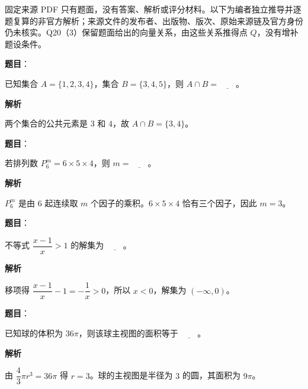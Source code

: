 

\begin{gktip}
固定来源 PDF 只有题面，没有答案、解析或评分材料。以下为编者独立推导并逐题复算的非官方解析；来源文件的发布者、出版物、版次、原始来源链及官方身份仍未核实。Q20（3）保留题面给出的向量关系，由这些关系推得点 $Q$，没有增补题设条件。
\end{gktip}

\begin{answer}

\textbf{题目}：

已知集合 $A=\{1,2,3,4\}$，集合 $B=\{3,4,5\}$，则 $A\cap B=\underline{\qquad}$。

\textbf{解析}

两个集合的公共元素是 $3$ 和 $4$，故 $A\cap B=\{3,4\}$。


\end{answer}
\begin{answer}

\textbf{题目}：

若排列数 $P_6^m=6\times5\times4$，则 $m=\underline{\qquad}$。

\textbf{解析}

$P_6^m$ 是由 $6$ 起连续取 $m$ 个因子的乘积。$6\times5\times4$ 恰有三个因子，因此 $m=3$。


\end{answer}
\begin{answer}

\textbf{题目}：

不等式 $\dfrac{x-1}{x}>1$ 的解集为 $\underline{\qquad}$。

\textbf{解析}

移项得 $\dfrac{x-1}{x}-1=-\dfrac1x>0$，所以 $x<0$，解集为 $(-\infty,0)$。


\end{answer}
\begin{answer}

\textbf{题目}：

已知球的体积为 $36\pi$，则该球主视图的面积等于 $\underline{\qquad}$。

\textbf{解析}

由 $\dfrac43\pi r^3=36\pi$ 得 $r=3$。球的主视图是半径为 $3$ 的圆，其面积为 $9\pi$。


\end{answer}

